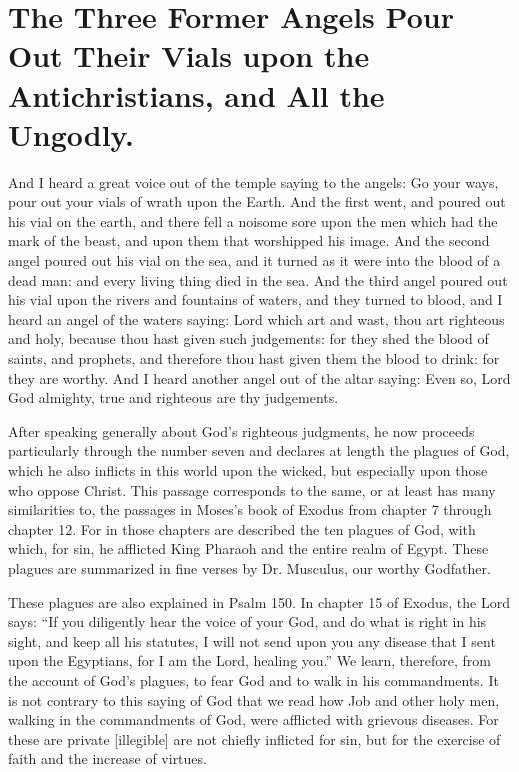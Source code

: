\chapter[Sermon 69. The Three Former Angels Pour Out Their Vials upon the Antichristians, and All the Ungodly.]{The Three Former Angels Pour Out Their Vials upon the Antichristians, and All the Ungodly.}
\label{sermon:069}

And I heard a great voice out of the temple saying to the angels: Go your ways, pour out your vials of wrath upon the Earth. And the first went, and poured out his vial on the earth, and there fell a noisome sore upon the men which had the mark of the beast, and upon them that worshipped his image. And the second angel poured out his vial on the sea, and it turned as it were into the blood of a dead man: and every living thing died in the sea. And the third angel poured out his vial upon the rivers and fountains of waters, and they turned to blood, and I heard an angel of the waters saying: Lord which art and wast, thou art righteous and holy, because thou hast given such judgements: for they shed the blood of saints, and prophets, and therefore thou hast given them the blood to drink: for they are worthy. And I heard another angel out of the altar saying: Even so, Lord God almighty, true and righteous are thy judgements.

After speaking generally about God’s righteous judgments, he now proceeds particularly through the number seven and declares at length the plagues of God, which he also inflicts in this world upon the wicked, but especially upon those who oppose Christ. This passage corresponds to the same, or at least has many similarities to, the passages in Moses’s book of Exodus from chapter 7 through chapter 12. For in those chapters are described the ten plagues of God, with which, for sin, he afflicted King Pharaoh and the entire realm of Egypt. These plagues are summarized in fine verses by Dr. Musculus, our worthy Godfather.

These plagues are also explained in Psalm 150. In chapter 15 of Exodus, the Lord says: “If you diligently hear the voice of your God, and do what is right in his sight, and keep all his statutes, I will not send upon you any disease that I sent upon the Egyptians, for I am the Lord, healing you.” We learn, therefore, from the account of God’s plagues, to fear God and to walk in his commandments. It is not contrary to this saying of God that we read how Job and other holy men, walking in the commandments of God, were afflicted with grievous diseases. For these are private [illegible] are not chiefly inflicted for sin, but for the exercise of faith and the increase of virtues.

